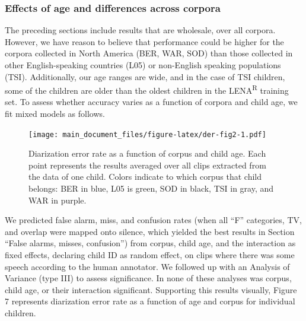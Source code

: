 \documentclass[english,table,man,floatsintext]{apa6}
\begin{document}
\hypertarget{effects-of-age-and-differences-across-corpora}{%
\subsubsection{Effects of age and differences across corpora}\label{effects-of-age-and-differences-across-corpora}}

The preceding sections include results that are wholesale, over all corpora. However, we have reason to believe that performance could be higher for the corpora collected in North America (BER, WAR, SOD) than those collected in other English-speaking countries (L05) or non-English speaking populations (TSI). Additionally, our age ranges are wide, and in the case of TSI children, some of the children are older than the oldest children in the LENA\textsuperscript{R} training set. To assess whether accuracy varies as a function of corpora and child age, we fit mixed models as follows.

\begin{figure}
\centering
\texttt{[image: main\_document\_files/figure-latex/der-fig2-1.pdf]}
\caption{\label{fig:der-fig2}Diarization error rate as a function of corpus and child age. Each point represents the results averaged over all clips extracted from the data of one child. Colors indicate to which corpus that child belongs: BER in blue, L05 is green, SOD in black, TSI in gray, and WAR in purple.}
\end{figure}

We predicted false alarm, miss, and confusion rates (when all \enquote{F} categories, TV, and overlap were mapped onto silence, which yielded the best results in Section \enquote{False alarms, misses, confusion}) from corpus, child age, and the interaction as fixed effects, declaring child ID as random effect, on clips where there was some speech according to the human annotator. We followed up with an Analysis of Variance (type III) to assess significance. In none of these analyses was corpus, child age, or their interaction significant. Supporting this results visually, Figure 7 represents diarization error rate as a function of age and corpus for individual children.
\end{document}
